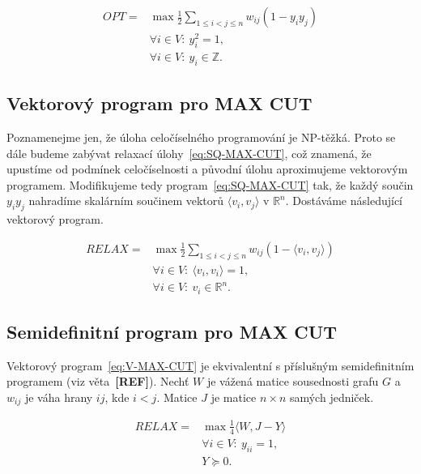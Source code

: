 \begin{equation}\tag{SQ-MAX-CUT}
    \begin{split}
        OPT = &\max \frac{1}{2} \sum_{1 \leq i < j \leq n} w_{ij} (1 - y_i y_j) \\
        &\forall i \in V:\ y_i^2 = 1, \\
        &\forall i \in V:\ y_i \in \mathbb{Z}.
    \end{split}
    \label{eq:SQ-MAX-CUT}
\end{equation}


\subsection{Vektorový program pro MAX CUT}

Poznamenejme jen, že úloha celočíselného programování je NP-těžká. Proto se dále budeme zabývat relaxací úlohy~\ref{eq:SQ-MAX-CUT}, což znamená, že upustíme od podmínek celočíselnosti a původní úlohu aproximujeme vektorovým programem. Modifikujeme tedy program~\ref{eq:SQ-MAX-CUT} tak, že každý součin $y_i y_j$ nahradíme skalárním součinem vektorů $\langle v_i, v_j \rangle$ v $\mathbb{R}^n$. Dostáváme následující vektorový program.

\begin{equation}\tag{V-MAX-CUT}
    \begin{split}
        RELAX = &\max \frac{1}{2} \sum_{1 \leq i < j \leq n} w_{ij} (1 - \langle v_i, v_j \rangle) \\
        &\forall i \in V:\ \langle v_i, v_i \rangle = 1, \\
        &\forall i \in V:\ v_i \in \mathbb{R}^n.
    \end{split}
    \label{eq:V-MAX-CUT}
\end{equation}


\subsection{Semidefinitní program pro MAX CUT}

Vektorový program~\ref{eq:V-MAX-CUT} je ekvivalentní s příslušným semidefinitním programem (viz věta~\textbf{[REF]}). Nechť $W$ je vážená matice sousednosti grafu $G$ a $w_{ij}$ je váha hrany $ij$, kde $i < j$. Matice $J$ je matice $n \times n$ samých jedniček.

\begin{equation}\tag{SDP-MAX-CUT}
    \begin{split}
        RELAX = &\max \frac{1}{4} \langle W, J - Y \rangle \\
        &\forall i \in V:\ y_{ii} = 1, \\
        &Y \succeq 0.
    \end{split}
    \label{eq:SDP-MAX-CUT}
\end{equation}

